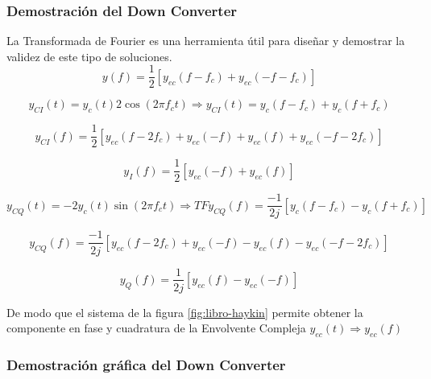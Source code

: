 \subsubsection{Demostración del Down Converter}

La Transformada de Fourier es una herramienta útil para diseñar y demostrar la validez de este tipo de soluciones.\\

\begin{equation} \label{capdos_siete}	
y(f)= \frac{1}{2}[y_{ec}(f-f_{c})+y_{ec}(-f-f_{c})]
\end{equation}

\begin{equation} \label{capdos_ocho}
y_{CI}(t) = y_{c}(t)2\cos (2\pi f_{c}t) \Longrightarrow y_{CI}(t) = y_{c}(f-f_{c})+y_{c}(f+f_{c}) 
\end{equation}

\begin{equation} \label{capdos_nueve}
y_{CI}(f) = \frac{1}{2}  [y_{ec}(f-2f_{c}) + y_{ec}(-f) + y_{ec}(f)+y_{ec}(-f-2f_{c})]
\end{equation}

\begin{equation} \label{capdos_diez}
y_{I}(f) = \frac{1}{2}[y_{ec}(-f) + y_{ec}(f)]
\end{equation}

\begin{equation} \label{capdos_once}
y_{CQ}(t) = -2y_{c}(t)\sin (2\pi f_{c}t)  \Longrightarrow TF y_{CQ}(f)= \frac{-1}{2j} [y_{c}(f-f_{c})-y_{c}(f+f_{c})]
\end{equation}

\begin{equation} \label{capdos_doce}
y_{CQ}(f) = \frac{-1}{2j} [y_{ec}(f-2f_{c}) + y_{ec}(-f) - y_{ec}(f)- y_{ec}(-f-2f_{c})]
\end{equation}

\begin{equation} \label{capdos_trece}
y_{Q}(f) = \frac{1}{2j} [y_{ec}(f)- y_{ec}(-f)]
\end{equation}

De modo que el sistema de la figura \ref{fig:libro-haykin} permite obtener la componente en fase y cuadratura de la Envolvente Compleja $y_{ec}(t) \Longrightarrow  y_{ec}(f)$

\subsubsection{Demostración gráfica del Down Converter}

